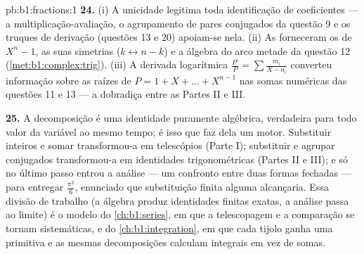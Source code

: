 \begin{solution}{pb:b1:fractions:1}
\textbf{24.} (i) A unicidade legitima toda identificação de
coeficientes --- a multiplicação-avaliação, o agrupamento de pares
conjugados da questão 9 e os truques de derivação (questões 13 e 20)
apoiam-se nela. (ii) As  forneceram os  de $X^n -
1$, as suas simetrias ($k \leftrightarrow n-k$) e a
álgebra do arco metade da questão 12
(\cref{met:b1:complex:trig}). (iii) A derivada logarítmica
$\frac{P'}P = \sum\frac{m_i}{X-a_i}$ converteu informação sobre
as raízes de $P = 1 + X + \dots + X^{n-1}$ nas somas numéricas
das questões 11 e 13 --- a dobradiça entre as Partes II e
III.

\textbf{25.} A decomposição é uma identidade puramente algébrica,
verdadeira para todo valor da variável ao mesmo tempo; é isso que faz
dela um motor. Substituir inteiros e somar transformou-a em
telescópios (Parte I); substituir  e agrupar
conjugados transformou-a em identidades trigonométricas (Partes II e
III); e só no último passo entrou a análise --- um
confronto entre duas formas fechadas --- para entregar $\frac{\pi^2}6$,
enunciado que substituição finita alguma alcançaria. Essa divisão de
trabalho (a álgebra produz identidades finitas exatas, a análise passa
ao limite) é o modelo do \cref{ch:b1:series}, em que a
telescopagem e a comparação se tornam sistemáticas, e do
\cref{ch:b1:integration}, em que cada tijolo ganha uma primitiva
e as mesmas decomposições calculam integrais em vez de somas.
\end{solution}
